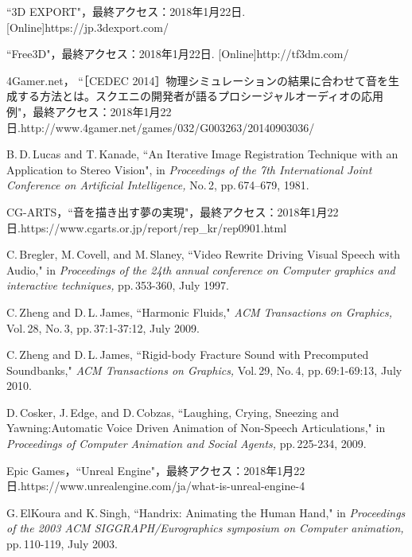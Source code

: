 \renewcommand{\refname}{参考文献}	
%
\begin{thebibliography}{55}
%
``3D EXPORT"，最終アクセス：2018年1月22日.
[Online]https://jp.3dexport.com/

``Free3D"，最終アクセス：2018年1月22日.
[Online]http://tf3dm.com/

4Gamer.net，
``［CEDEC 2014］物理シミュレーションの結果に合わせて音を生成する方法とは。スクエニの開発者が語るプロシージャルオーディオの応用例"，最終アクセス：2018年1月22日.\newline
[Online]http://www.4gamer.net/games/032/G003263/20140903036/

B.\,D.\,Lucas and T.\,Kanade,
 ``An Iterative Image Registration Technique with an Application to Stereo Vision",
 in \textit{Proceedings of the 7th International Joint Conference on Artificial Intelligence,} No.\,2, pp.\,674--679, 1981.

CG-ARTS，``音を描き出す夢の実現"，最終アクセス：2018年1月22日.\newline
[Online]https://www.cgarts.or.jp/report/rep\_kr/rep0901.html

C.\,Bregler, M.\,Covell, and M.\,Slaney,
 ``Video Rewrite Driving Visual Speech with Audio,"
 in \textit{Proceedings of the 24th annual conference on Computer graphics and interactive techniques,} pp.\,353-360, July 1997.

C.\,Zheng and D.\,L.\,James,
``Harmonic Fluids,"
\textit{ACM Transactions on Graphics,} Vol.\,28, No.\,3, pp.\,37:1-37:12, July 2009.

C.\,Zheng and D.\,L.\,James,
``Rigid-body Fracture Sound with Precomputed Soundbanks,"
\textit{ACM Transactions on Graphics,} Vol.\,29, No.\,4, pp.\,69:1-69:13, July 2010.

D.\,Cosker, J.\,Edge, and D.\,Cobzas,
 ``Laughing, Crying, Sneezing and Yawning:Automatic Voice Driven Animation of Non-Speech Articulations,"
 in \textit{Proceedings of Computer Animation and Social Agents,} pp.\,225-234, 2009.

Epic Games，``Unreal Engine"，最終アクセス：2018年1月22日.\newline
[Online]https://www.unrealengine.com/ja/what-is-unreal-engine-4

G.\,ElKoura and K.\,Singh,
 ``Handrix: Animating the Human Hand,"
  in \textit{Proceedings of the 2003 ACM SIGGRAPH/Eurographics symposium on Computer animation,}
  pp.\,110-119, July 2003.


\end{thebibliography}
